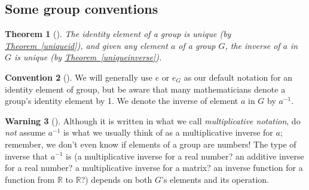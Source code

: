 \documentclass[10pt,]{book}
\theoremstyle{plain}
\newtheorem{theorem}{Theorem}[section]
\theoremstyle{definition}
\theoremstyle{definition}
\newtheorem{observation}[theorem]{Convention}
\newtheorem{warning}[theorem]{Warning}
\theoremstyle{definition}
\theoremstyle{definition}
\numberwithin{equation}{section}
\def\R{\mathbb{R}}
\begin{document}
\subsection[{Some group conventions}]{Some group conventions}\label{subsection-1}
\begin{theorem}[{}]\label{theorem-9}
The identity element of a group is unique (by \hyperref[uniqueid]{Theorem~\ref{uniqueid}}), and given any element \(a\) of a group \(G\), the inverse of \(a\) in \(G\) is unique (by \hyperref[uniqueinverse]{Theorem~\ref{uniqueinverse}}).%
\end{theorem}
\begin{observation}[]\label{observation-1}
\label{notation-35}
 \label{notation-36}
We will generally use \(e\) or \(e_G\) as our default notation for an identity element of group, but be aware that many mathematicians denote a group's identity element by 1. We  denote the inverse of element \(a\) in \(G\) by \(a^{-1}\).%
\end{observation}
\begin{warning}[]\label{warning-6}
Although it is written in what we call  \emph{multiplicative notation}, do \emph{not} assume \(a^{-1}\) is what we usually think of as a multiplicative inverse for \(a\); remember, we don't even know if elements of a group are numbers! The type of inverse that \(a^{-1}\) is (a multiplicative inverse for a real number? an additive inverse for a real number? a multiplicative inverse for a matrix? an inverse function for a function from \(\R\) to \(\R\)?) depends on both \(G\)'s elements and its operation.%
\end{warning}
\end{document}
